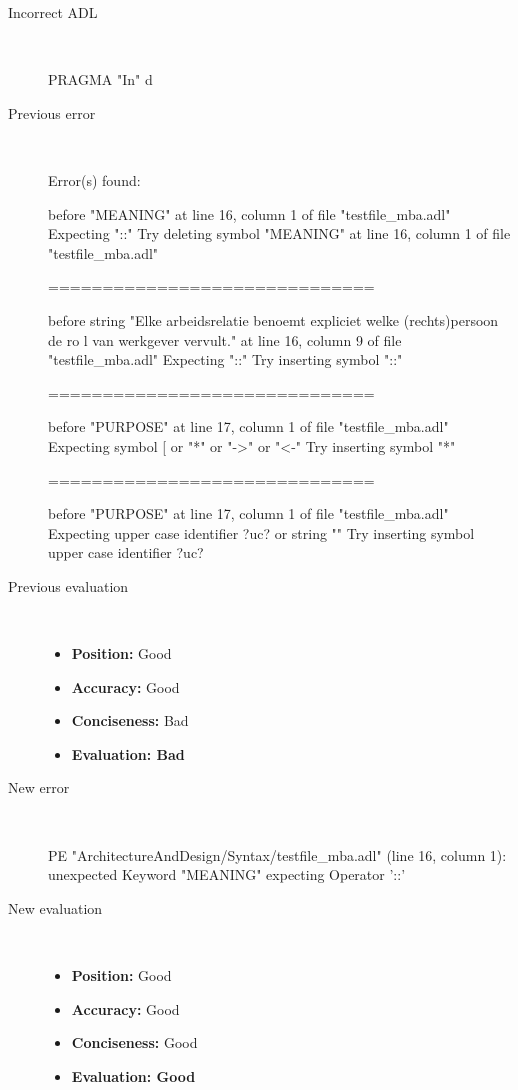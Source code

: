 \hrulefill

\begin{description}
  \item[Incorrect ADL]~\\
\begin{adl}
PRAGMA "In" d\end{adl}
  \item[Previous error]~\\
\begin{haskell}
Error(s) found:

before "MEANING" at line 16, column 1 of file "testfile_mba.adl"
Expecting "::"
Try deleting symbol "MEANING" at line 16, column 1 of file "testfile_mba.adl"

==============================

before string "Elke arbeidsrelatie benoemt expliciet welke (rechts)persoon de ro
l van werkgever vervult." at line 16, column 9 of file "testfile_mba.adl"
Expecting "::"
Try inserting symbol "::"

==============================

before "PURPOSE" at line 17, column 1 of file "testfile_mba.adl"
Expecting symbol [ or "*" or "->" or "<-"
Try inserting symbol "*"

==============================

before "PURPOSE" at line 17, column 1 of file "testfile_mba.adl"
Expecting upper case identifier ?uc? or string ""
Try inserting symbol upper case identifier ?uc?\end{haskell}
  \item[Previous evaluation]~\\
    \begin{itemize}
    \item \textbf{Position:} Good
    \item \textbf{Accuracy:} Good
    \item \textbf{Conciseness:} Bad
    \item \textbf{Evaluation: Bad}
    \end{itemize}
  \item[New error]~\\
\begin{haskell}
PE "ArchitectureAndDesign/Syntax/testfile_mba.adl" (line 16, column 1):
unexpected Keyword "MEANING"
expecting Operator '::'
\end{haskell}
  \item[New evaluation]~\\
    \begin{itemize}
    \item \textbf{Position:} Good
    \item \textbf{Accuracy:} Good
    \item \textbf{Conciseness:} Good
    \item \textbf{Evaluation: Good}
    \end{itemize}
  \end{description}

